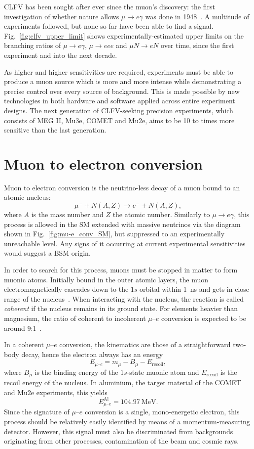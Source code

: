 CLFV has been sought after ever since the muon's discovery: the first
investigation of whether nature allows $\mu \rightarrow e \gamma$ was done in
1948~\cite{PhysRev.73.257}. A multitude of experiments followed, but none so far
have been able to find a signal. Fig.~\ref{fig:clfv_upper_limit} shows
experimentally-estimated upper limits on the branching ratios of $\mu
\rightarrow e\gamma$, $\mu\rightarrow eee$ and $\mu N \rightarrow e N$ over
time, since the first experiment and into the next decade. 

As higher and higher sensitivities are required, experiments must be able to
produce a muon source which is more and more intense while demonstrating a
precise control over every source of background. This is made possible by new
technologies in both hardware and software applied across entire experiment
designs. The next generation of CLFV-seeking precision experiments, which
consists of MEG II, Mu3e, COMET and Mu2e, aims to be 10 to 
times more sensitive than the last generation.


\section{Muon to electron conversion}
Muon to electron conversion is the neutrino-less decay of a muon bound to an
atomic nucleus:
$$
\mu^- + N(A, Z) \rightarrow e^- + N(A, Z),
$$
where $A$ is the mass number and $Z$ the atomic number.
Similarly to $\mu\rightarrow e\gamma$, this process is allowed in the SM
extended with massive neutrinos via the diagram shown in
Fig.~\ref{fig:mu-e_conv_SM}, but suppressed to an experimentally
unreachable level. Any signs of it occurring at current experimental
sensitivities would suggest a BSM origin.

In order to search for this process, muons must be stopped in matter to form
muonic atoms. Initially bound in the outer atomic layers, the muon
electromagnetically cascades down to the $1s$ orbital within \SI{1}{\ns}
and gets in close range of the nucleus~\cite{Knecht2020}. 
When interacting with the nucleus, the reaction is called \emph{coherent} if the
nucleus remains in its ground state. For elements heavier than magnesium, the
ratio of coherent to incoherent $\mu$--$e$ conversion is expected to be around
9:1~\cite{CHIANG1993526}.

In a coherent $\mu$--$e$ conversion, the kinematics are those of a
straightforward two-body decay, hence the electron always has an energy
\begin{equation*}\label{eq:mu_e_conv_energy}
E_{\mu\text{--}e} = m_\mu - B_\mu - E_\mathrm{recoil},
\end{equation*}
where $B_\mu$ is the binding energy of the $1s$-state muonic atom and
$E_\mathrm{recoil}$ is the recoil energy of the nucleus. In aluminium, the
target material of the COMET and Mu2e experiments, this yields
$$
    E^\mathrm{Al}_{\mu\text{--}e} = \SI{104.97}{\MeV}.
$$
Since the signature of $\mu$--$e$ conversion is a single, mono-energetic
electron, this process should be relatively easily identified by means of a
momentum-measuring detector. However, this signal must also be discriminated
from backgrounds originating from other processes, contamination of the beam and
cosmic rays.

